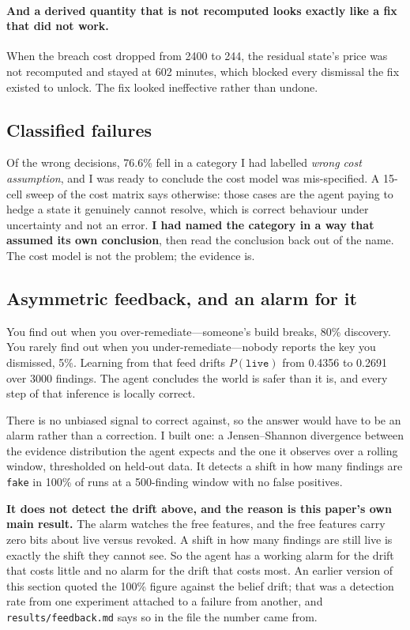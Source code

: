 \documentclass{article}
\begin{document}
\paragraph{And a derived quantity that is not recomputed looks exactly like a fix
that did not work.} When the breach cost dropped from 2400 to 244, the residual
state's price was not recomputed and stayed at 602 minutes, which blocked every
dismissal the fix existed to unlock. The fix looked ineffective rather than
undone.

\subsection{Classified failures}

Of the wrong decisions, 76.6\% fell in a category I had labelled \emph{wrong cost
assumption}, and I was ready to conclude the cost model was mis-specified. A
15-cell sweep of the cost matrix says otherwise: those cases are the agent paying
to hedge a state it genuinely cannot resolve, which is correct behaviour under
uncertainty and not an error. \textbf{I had named the category in a way that
assumed its own conclusion}, then read the conclusion back out of the name. The
cost model is not the problem; the evidence is.

\subsection{Asymmetric feedback, and an alarm for it}

You find out when you over-remediate---someone's build breaks, 80\% discovery.
You rarely find out when you under-remediate---nobody reports the key you
dismissed, 5\%. Learning from that feed drifts $P(\texttt{live})$ from 0.4356 to
0.2691 over 3000 findings. The agent concludes the world is safer than it is, and
every step of that inference is locally correct.

There is no unbiased signal to correct against, so the answer would have to be an
alarm rather than a correction. I built one: a Jensen--Shannon divergence between
the evidence distribution the agent expects and the one it observes over a
rolling window, thresholded on held-out data. It detects a shift in how many
findings are \texttt{fake} in 100\% of runs at a 500-finding window with no
false positives.

\textbf{It does not detect the drift above, and the reason is this paper's own
main result.} The alarm watches the free features, and the free features carry
zero bits about live versus revoked. A shift in how many findings are still live
is exactly the shift they cannot see. So the agent has a working alarm for the
drift that costs little and no alarm for the drift that costs most. An earlier
version of this section quoted the 100\% figure against the belief drift; that
was a detection rate from one experiment attached to a failure from another, and
\texttt{results/feedback.md} says so in the file the number came from.
\end{document}
